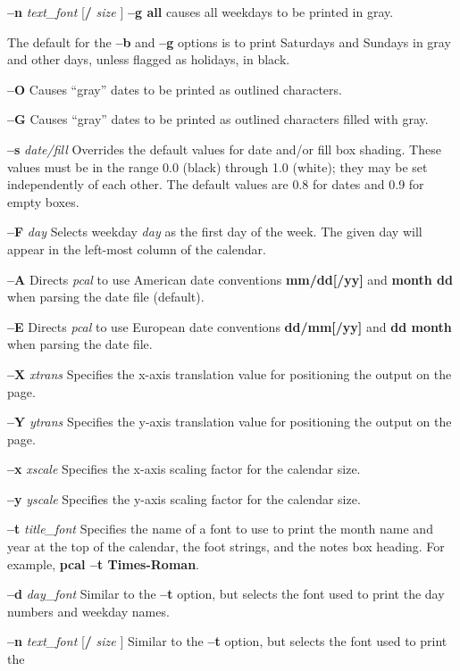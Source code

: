 \begin{TPlist}{{\bf --n} {\it text\_font} [{\bf /} {\it size} ]}
{\bf --g all} causes all weekdays to be printed in gray.
\begin{IPlist}
\IPitem{{}}
The default for the {\bf --b} and {\bf --g} options is to print Saturdays
and Sundays in gray and other days, unless flagged as holidays, in black.
\end{IPlist}
\item[{{\bf --O}}]
Causes ``gray'' dates to be printed as outlined characters.
\item[{{\bf --G}}]
Causes ``gray'' dates to be printed as outlined characters filled with
gray.
\item[{{\bf --s} {\it {date}/{fill}}}]
Overrides the default values for date and/or fill box shading.  These
values must be in the range 0.0 (black) through 1.0 (white); they may be
set independently of each other.  The default values are 0.8 for dates
and 0.9 for empty boxes.
\item[{{\bf --F} {\it day}}]
Selects weekday {\it day} as the first day of the week.  The given day
will appear in the left-most column of the calendar.
\item[{{\bf --A}}]
Directs {\it pcal} to use American date conventions {\bf mm/dd[/yy]}
and {\bf month dd} when parsing the date file (default).
\item[{{\bf --E}}]
Directs {\it pcal} to use European date conventions {\bf dd/mm[/yy]}
and {\bf dd month} when parsing the date file.
\item[{{\bf --X} {\it xtrans}}]
Specifies the x-axis translation value for positioning the output on the
page.
\item[{{\bf --Y} {\it ytrans}}]
Specifies the y-axis translation value for positioning the output on the
page.
\item[{{\bf --x} {\it xscale}}]
Specifies the x-axis scaling factor for the calendar size.
\item[{{\bf --y} {\it yscale}}]
Specifies the y-axis scaling factor for the calendar size.
\item[{{\bf --t} {\it title\_font}}]
Specifies the name of a font to use to print the month name and year at
the top of the calendar, the foot strings, and the notes box heading.
For example, {\bf pcal --t Times-Roman}.
\item[{{\bf --d} {\it day\_font}}]
Similar to the {\bf --t} option, but selects the font used to print the
day numbers and weekday names.
\item[{{\bf --n} {\it text\_font} [{\bf /} {\it size} ]}]
Similar to the {\bf --t} option, but selects the font used to print the

\end{TPlist}

